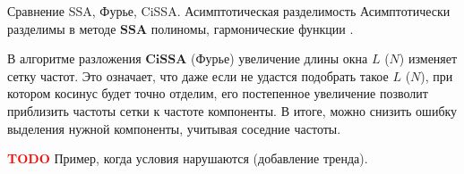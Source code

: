 \documentclass[notheorems, handout]{beamer}
\newcommand{\SSA}{\textbf{SSA}}
\newcommand{\CISSA}{\textbf{CiSSA}}
\begin{document}
	\begin{frame}{Сравнение SSA, Фурье, CiSSA. Асимптотическая разделимость}
		Асимптотически разделимы в методе $\SSA$ полиномы, гармонические функции \parencite{golyandina2001analysis}.
		
		В алгоритме разложения $\CISSA$ (Фурье) увеличение длины окна $L$ ($N$) изменяет сетку частот. Это означает, что даже если не удастся подобрать такое $L$ ($N$), при котором косинус будет точно отделим, его постепенное увеличение позволит приблизить частоты сетки к частоте компоненты. В итоге, можно снизить ошибку выделения нужной компоненты, учитывая соседние частоты.

	\end{frame}



	\begin{frame}
		\textcolor{red}{\textbf{TODO}} 
		Пример, когда условия нарушаются (добавление тренда).

		\begin{table}[ht]
			\centering
			\caption{1 + exp(x/100) + a1 * sin + a2 * cos} 
			\end{table}
	\end{frame}
\end{document}
